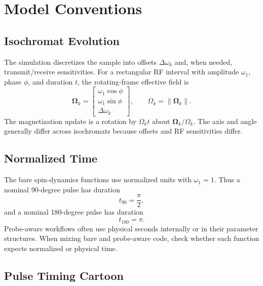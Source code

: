 \documentclass[11pt,oneside]{report}
\begin{document}
\chapter{Model Conventions}

\section{Isochromat Evolution}

The simulation discretizes the sample into offsets \(\Delta\omega_k\) and, when
needed, transmit/receive sensitivities. For a rectangular RF interval with
amplitude \(\omega_1\), phase \(\phi\), and duration \(t\), the rotating-frame
effective field is
\[
  \boldsymbol{\Omega}_k =
  \begin{bmatrix}
    \omega_1 \cos\phi \\
    \omega_1 \sin\phi \\
    \Delta\omega_k
  \end{bmatrix},
  \qquad
  \Omega_k = \|\boldsymbol{\Omega}_k\|.
\]
The magnetization update is a rotation by \(\Omega_k t\) about
\(\boldsymbol{\Omega}_k/\Omega_k\). The axis and angle generally differ across
isochromats because offsets and RF sensitivities differ.

\section{Normalized Time}

The bare spin-dynamics functions use normalized units with \(\omega_1=1\).
Thus a nominal 90-degree pulse has duration
\[
  t_{90} = \frac{\pi}{2},
\]
and a nominal 180-degree pulse has duration
\[
  t_{180} = \pi .
\]
Probe-aware workflows often use physical seconds internally or in their
parameter structures. When mixing bare and probe-aware code, check whether each
function expects normalized or physical time.

\section{Pulse Timing Cartoon}
\end{document}
